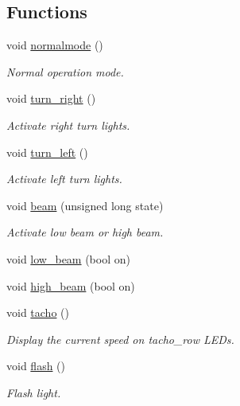 \subsection*{Functions}
\begin{DoxyCompactItemize}
\item 
void \hyperlink{group__car_gaa0a39b0689218537e29a29f9c3f2af47}{normalmode} ()
\begin{DoxyCompactList}\small\item\em Normal operation mode. \end{DoxyCompactList}\end{DoxyCompactItemize}
\begin{DoxyCompactItemize}
\item 
void \hyperlink{group__car_gaca3b725ebee32d3719a9c02b41002ea3}{turn\+\_\+right} ()
\begin{DoxyCompactList}\small\item\em Activate right turn lights. \end{DoxyCompactList}\item 
void \hyperlink{group__car_ga0565ad7a822d9d334bb50c088af22361}{turn\+\_\+left} ()
\begin{DoxyCompactList}\small\item\em Activate left turn lights. \end{DoxyCompactList}\item 
void \hyperlink{group__car_ga6b1fd674445dd1c654dfe8b8b65f168e}{beam} (unsigned long state)
\begin{DoxyCompactList}\small\item\em Activate low beam or high beam. \end{DoxyCompactList}\item 
void \hyperlink{group__car_ga29d5eff542aae0196b8e84b8a752e1df}{low\+\_\+beam} (bool on)
\item 
void \hyperlink{group__car_ga1088d06b4ab015d579e0ac2510d39f25}{high\+\_\+beam} (bool on)
\item 
void \hyperlink{group__car_gac7295d1018b2b948084ba5dbacf09d74}{tacho} ()
\begin{DoxyCompactList}\small\item\em Display the current speed on tacho\+\_\+row L\+E\+Ds. \end{DoxyCompactList}\item 
void \hyperlink{group__car_gaffb7c011f82f3fb47b39ebb2713a1cd8}{flash} ()
\begin{DoxyCompactList}\small\item\em Flash light. \end{DoxyCompactList}\end{DoxyCompactItemize}


